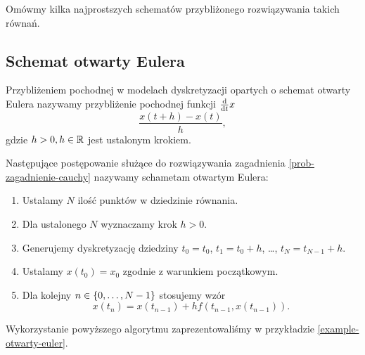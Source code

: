 \documentclass[12pt,a4paper]{report}
\begin{document}
Omówmy kilka najprostszych schematów przybliżonego rozwiązywania takich równań.

\subsection{Schemat otwarty Eulera}

\begin{definition}
Przybliżeniem pochodnej w modelach dyskretyzacji opartych o schemat otwarty Eulera nazywamy przybliżenie pochodnej funkcji $\frac{\mathrm{d} {} }{\mathrm{d}{t}}x$
$$
 \frac{x(t+h) - x(t)}{h},
$$
gdzie $h >0, h \in \mathbb{R} $ jest ustalonym krokiem. 
\end{definition}

\begin{algorithm}\label{Euler_algoritm}
Następujące postępowanie służące do rozwiązywania zagadnienia \ref{prob-zagadnienie-cauchy} nazywamy schametam otwartym Eulera:
\begin{enumerate}
\item Ustalamy $N$ ilość punktów w dziedzinie równania. 
\item Dla ustalonego $N$ wyznaczamy krok $h>0$. 
\item Generujemy dyskretyzację dziedziny $t_0 = t_0$, $t_1 = t_0 + h$, \ldots, $t_N = t_{N-1}+h$. 
\item Ustalamy $x(t_0) = x_0$ zgodnie z warunkiem początkowym.
\item Dla kolejny $n \in \left\lbrace {0, \ldots, N-1} \right\rbrace$ stosujemy wzór
$$
x(t_{n}) = x(t_{n-1}) + h f(t_{n-1}, x(t_{n-1})).
$$
\end{enumerate}
\end{algorithm}

Wykorzystanie powyższego algorytmu zaprezentowaliśmy w przykładzie \ref{example-otwarty-euler}.
\end{document}
